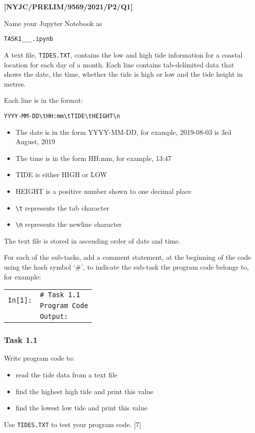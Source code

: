 \item \textbf{{[}NYJC/PRELIM/9569/2021/P2/Q1{]} }

Name your Jupyter Notebook as 

\texttt{TASK1\_<your name>\_<centre number>\_<index number>.ipynb }

A text file, \texttt{TIDES.TXT}, contains the low and high tide information
for a coastal location for each day of a month. Each line contains
tab-delimited data that shows the date, the time, whether the tide
is high or low and the tide height in metres. 

Each line is in the format: 

\texttt{YYYY-MM-DD\textbackslash tHH:mm\textbackslash tTIDE\textbackslash tHEIGHT\textbackslash n }
\begin{itemize}
\item The date is in the form YYYY-MM-DD, for example, 2019-08-03 is 3rd
August, 2019 
\item The time is in the form HH:mm, for example, 13:47 
\item TIDE is either HIGH or LOW 
\item HEIGHT is a positive number shown to one decimal place 
\item \texttt{\textbackslash t} represents the tab character 
\item \texttt{\textbackslash n} represents the newline character 
\end{itemize}
The text file is stored in ascending order of date and time. 

For each of the sub-tasks, add a comment statement, at the beginning
of the code using the hash symbol \textquoteleft \#\textquoteright ,
to indicate the sub-task the program code belongs to, for example: 
\noindent \begin{center}
\begin{tabular}{c|l|}
\cline{2-2} 
\multirow{2}{*}{\texttt{In{[}1{]}:}} & \texttt{\# Task 1.1}\tabularnewline
 & \texttt{Program Code}\tabularnewline
\cline{2-2} 
\multicolumn{1}{c}{} & \multicolumn{1}{l}{\texttt{Output:}}\tabularnewline
\end{tabular}
\par\end{center}

\subsubsection*{Task 1.1 }

Write program code to: 
\begin{itemize}
\item read the tide data from a text file 
\item find the highest high tide and print this value 
\item find the lowest low tide and print this value 
\end{itemize}
Use \texttt{TIDES.TXT} to test your program code.\hfill{} {[}7{]}

